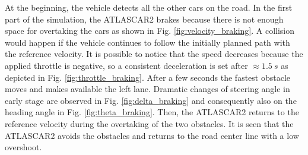 \documentclass[conference,11pt]{IEEEtran}
\begin{document}
At the beginning, the vehicle detects all the other cars on the road. In the first part of the simulation, the ATLASCAR2 brakes because there is not enough space for overtaking the cars as shown in Fig. \ref{fig:velocity_braking}. A collision would happen if the vehicle continues to follow the initially planned path with the reference velocity. It is possible to notice that the speed decreases because the applied throttle is negative, so a consistent deceleration is set after $\approx\SI{1.5}{s}$ as depicted in Fig. \ref{fig:throttle_braking}. After a few seconds the fastest obstacle moves and makes available the left lane. Dramatic changes of steering angle in early stage are observed in Fig. \ref{fig:delta_braking} and consequently also on the heading angle in Fig. \ref{fig:theta_braking}. Then, the ATLASCAR2 returns to the reference velocity during the overtaking of the two obstacles. It is seen that the ATLASCAR2 avoids the obstacles and returns to the road center line with a low overshoot.
\end{document}
